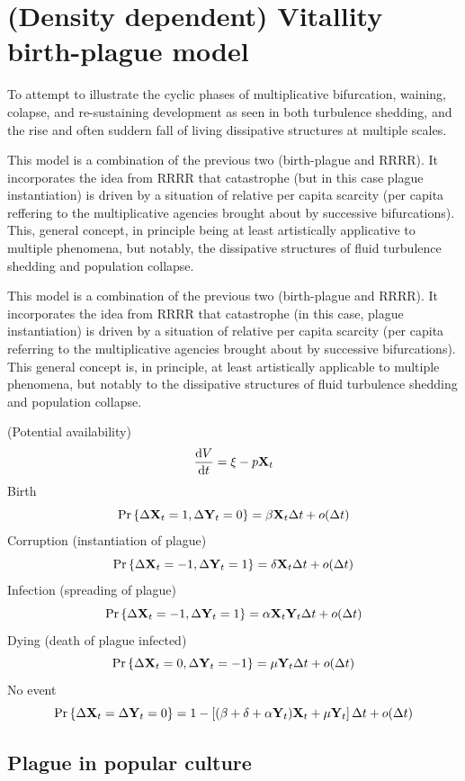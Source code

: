 \section{(Density dependent) Vitallity birth-plague model}

To attempt to illustrate the cyclic phases of multiplicative bifurcation, waining, colapse, and re-sustaining development as seen in both turbulence shedding, and the rise and often suddern fall of living dissipative structures at multiple scales. \par 

\vspace{10pt}
This model is a combination of the previous two (birth-plague and RRRR).  It incorporates the idea from RRRR that catastrophe (but in this case plague instantiation) is driven by a situation of relative per capita scarcity (per capita reffering to the multiplicative agencies brought about by successive bifurcations).  This, general concept, in principle being at least artistically applicative to multiple phenomena,  but notably, the dissipative structures of fluid turbulence shedding and population collapse. 

This model is a combination of the previous two (birth-plague and RRRR). It incorporates the idea from RRRR that catastrophe (in this case, plague instantiation) is driven by a situation of relative per capita scarcity (per capita referring to the multiplicative agencies brought about by successive bifurcations). This general concept is, in principle, at least artistically applicable to multiple phenomena, but notably to the dissipative structures of fluid turbulence shedding and population collapse.

(Potential availability)
 $$\displaystyle\frac{{\rm d} V}{{\rm d} t} = \xi - p {{\bf X}_t}$$
Birth
$${\text{Pr}\left\{\Delta {{\bf X}_t} = 1, \Delta {{\bf Y}_t} = 0\right\}} = \beta {{\bf X}_t} \Delta t +o(\Delta t)$$
Corruption (instantiation of plague)
$${\text{Pr}\left\{\Delta {{\bf X}_t} = -1, \Delta {{\bf Y}_t} = 1\right\}} = \delta {{\bf X}_t} \Delta t +o(\Delta t)$$
Infection (spreading of plague)
$${\text{Pr}\left\{\Delta {{\bf X}_t} = -1, \Delta {{\bf Y}_t} = 1\right\}} = \alpha {{\bf X}_t}{{\bf Y}_t} \Delta t +o(\Delta t)$$
Dying (death of plague infected)
$${\text{Pr}\left\{\Delta {{\bf X}_t} = 0, \Delta {{\bf Y}_t} = -1\right\}} = \mu {{\bf Y}_t} \Delta t +o(\Delta t)$$
No event
$${\text{Pr}\left\{\Delta {{\bf X}_t} = \Delta {{\bf Y}_t} = 0\right\}} =1 - \left[(\beta + \delta + \alpha {{\bf Y}_t}) {{\bf X}_t} + \mu {{\bf Y}_t}\right] \Delta t +o(\Delta t)$$



\subsection*{Plague in popular culture}

